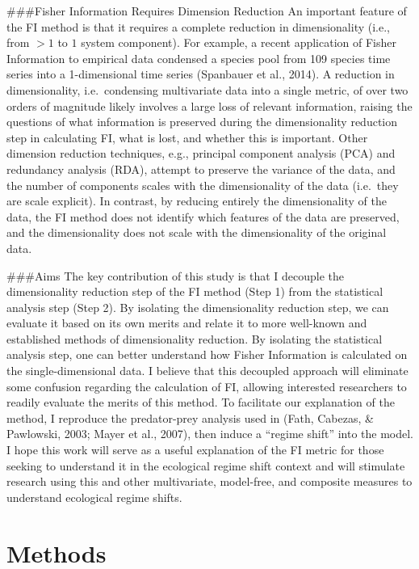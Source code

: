 \documentclass[12pt,twoside,openany]{reedthesis}
\begin{document}
\#\#\#Fisher Information Requires Dimension Reduction
An important feature of the FI method is that it requires a complete reduction in dimensionality (i.e., from \(>1\) to \(1\) system component). For example, a recent application of Fisher Information to empirical data condensed a species pool from 109 species time series into a 1-dimensional time series (Spanbauer et al., 2014). A reduction in dimensionality, i.e.~condensing multivariate data into a single metric, of over two orders of magnitude likely involves a large loss of relevant information, raising the questions of what information is preserved during the dimensionality reduction step in calculating FI, what is lost, and whether this is important. Other dimension reduction techniques, e.g., principal component analysis (PCA) and redundancy analysis (RDA), attempt to preserve the variance of the data, and the number of components scales with the dimensionality of the data (i.e.~they are scale explicit). In contrast, by reducing entirely the dimensionality of the data, the FI method does not identify which features of the data are preserved, and the dimensionality does not scale with the dimensionality of the original data.

\#\#\#Aims
The key contribution of this study is that I decouple the dimensionality reduction step of the FI method (Step 1) from the statistical analysis step (Step 2). By isolating the dimensionality reduction step, we can evaluate it based on its own merits and relate it to more well-known and established methods of dimensionality reduction. By isolating the statistical analysis step, one can better understand how Fisher Information is calculated on the single-dimensional data. I believe that this decoupled approach will eliminate some confusion regarding the calculation of FI, allowing interested researchers to readily evaluate the merits of this method. To facilitate our explanation of the method, I reproduce the predator-prey analysis used in (Fath, Cabezas, \& Pawlowski, 2003; Mayer et al., 2007), then induce a ``regime shift'' into the model. I hope this work will serve as a useful explanation of the FI metric for those seeking to understand it in the ecological regime shift context and will stimulate research using this and other multivariate, model-free, and composite measures to understand ecological regime shifts.

\hypertarget{methods-1}{%
\section{Methods}\label{methods-1}}
\end{document}
